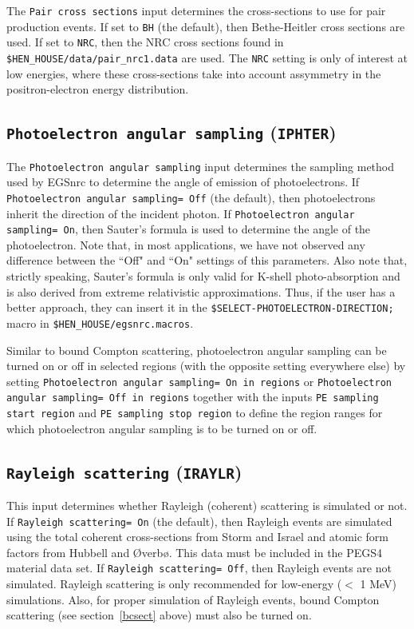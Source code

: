 \documentclass[12pt,twoside]{article}      %
\begin{document}
The {\tt Pair cross sections} input determines the cross-sections to
use for pair production events.  If set to {\tt BH} (the default), then
Bethe-Heitler cross sections are used.  If set to {\tt NRC}, then the
NRC cross sections found in {\tt \$HEN\_HOUSE/data/pair\_nrc1.data} are
used.  The {\tt NRC} setting is only of interest at low energies, where
these cross-sections take into account assymmetry in the positron-electron
energy distribution.

\subsection{{\tt Photoelectron angular sampling} ({\tt IPHTER})}

The {\tt Photoelectron angular sampling} input determines the sampling method
used by EGSnrc to determine the angle of emission of photoelectrons.
If {\tt Photoelectron angular sampling= Off} (the default), then
 photoelectrons inherit the direction of the incident photon.  If
{\tt Photoelectron angular sampling= On}, then Sauter's formula
\cite{Sa31} is used to determine the angle of the photoelectron.  Note
that, in most applications, we have not observed any difference between
the ``Off" and ``On" settings of this parameters.  Also note that,
strictly speaking, Sauter's formula is only valid for K-shell photo-absorption
and is also derived from extreme relativistic approximations.  Thus, if
the user has a better approach, they can insert it in the
{\tt \$SELECT-PHOTOELECTRON-DIRECTION;} macro in
{\tt \$HEN\_HOUSE/egsnrc.macros}.

Similar to bound Compton scattering, photoelectron angular sampling
can be turned on or off in selected regions (with the opposite setting
everywhere else) by setting
{\tt Photoelectron angular sampling= On in regions} or
{\tt Photoelectron angular sampling= Off in regions} together with
the inputs {\tt PE sampling start region} and
{\tt PE sampling stop region} to define the region ranges for which
photoelectron angular sampling is to be turned on or off.

\subsection{{\tt Rayleigh scattering} ({\tt IRAYLR})}
\label{rayleighsect}

This input determines whether Rayleigh (coherent) scattering is
simulated or not.
If {\tt Rayleigh scattering= On} (the default), then Rayleigh events are simulated
using the total coherent cross-sections from Storm and
Israel\cite{SI70} and atomic form factors from Hubbell and {\O}verb{\o}\cite{HO79}.
This data must be included in the PEGS4 material data set.
If {\tt Rayleigh scattering= Off}, then Rayleigh
events are not simulated.  Rayleigh scattering is only recommended for
low-energy ($<$ 1 MeV) simulations.  Also, for proper simulation
of Rayleigh events, bound Compton scattering (see section~\ref{bcsect} above)
must also be turned on.
\end{document}
